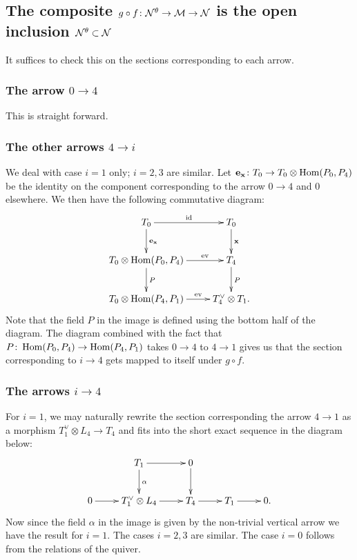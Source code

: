 \documentclass{amsart}
\theoremstyle{definition}
\begin{document}
\subsection{The composite $g \circ f \colon \mathcal{N}^\theta \rightarrow \mathcal{M} \rightarrow \mathcal{N}$ is the open inclusion $\mathcal{N}^\theta \subset \mathcal{N}$}

It suffices to check this on the sections corresponding to each arrow.

\subsubsection{The arrow $0 \rightarrow 4$}
This is straight forward.

\subsubsection{The other arrows $4 \rightarrow i$}
We deal with case $i=1$ only; $i=2,3$ are similar.
Let $\mathbf{e}_{\mathbf{x}} \colon T_0 \rightarrow  T_0 \otimes \operatorname{Hom}(P_0, P_4)$ be the identity on the component corresponding to the arrow $0 \rightarrow 4$ and 0 elsewhere.
We then have the following commutative diagram:
\begin{equation}
    \xymatrix{T_0 \ar[r]^{\text{id}} \ar[d]^{\bfe_\bfx} & T_0 \ar[d]^\bfx \\
    T_0 \otimes \Hom(P_0, P_4) \ar[r]^-{\text{ev}} \ar[d]^P & T_4 \ar[d]^P \\
    T_0 \otimes \Hom(P_4, P_1) \ar[r]^-{\text{ev}} &T_4^\vee \otimes T_1.
    }
\end{equation}
Note that the field $P$ in the image is defined using the bottom half of the diagram.
The diagram combined with the fact that $P \colon \operatorname{Hom}(P_0, P_4) \rightarrow \operatorname{Hom}(P_4, P_1)$ takes $0 \rightarrow 4$ to $4 \rightarrow 1$ gives us that the section corresponding to $i \rightarrow 4$ gets mapped to itself under $g \circ f$.

\subsubsection{The arrows $i \rightarrow 4$}

For $i =1$, we may naturally rewrite the section corresponding the arrow $4 \rightarrow 1$ as a morphism $T_1^\vee \otimes L_4 \rightarrow T_4$ and fits into the short exact sequence in the diagram below:
\begin{equation}
    \xymatrix{ & T_1 \ar[r] \ar[d]^\alpha & 0 \ar[d] & \\
    0 \ar[r] & T_1^\vee \otimes L_4 \ar[r] & T_4 \ar[r] & T_1 \ar[r] & 0.} 
\end{equation}
Now since the field $\alpha$ in the image is given by the non-trivial vertical arrow we have the result for $i=1$.
The cases $i=2,3$ are similar.
The case $i=0$ follows from the relations of the quiver.
\end{document}
